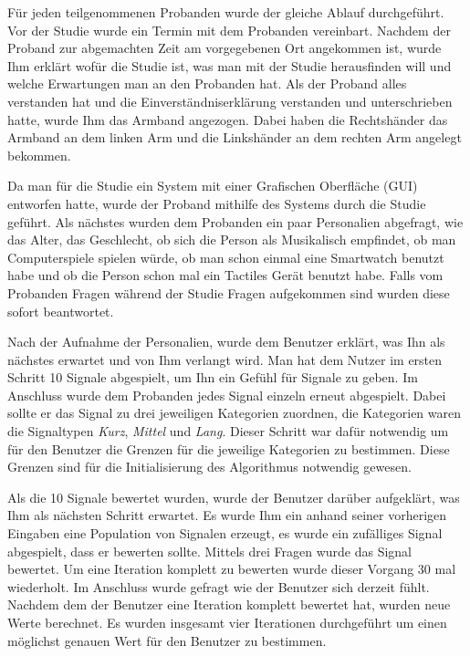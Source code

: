 F{\"u}r jeden teilgenommenen Probanden wurde der gleiche Ablauf durchgef{\"u}hrt. 
Vor der Studie wurde ein Termin mit dem Probanden vereinbart. 
Nachdem der Proband zur abgemachten Zeit am vorgegebenen Ort angekommen ist, wurde Ihm erkl{\"a}rt wof{\"u}r die Studie ist, was man mit der Studie herausfinden will und welche Erwartungen man an den Probanden hat. 
Als der Proband alles verstanden hat und die Einverst{\"a}ndniserkl{\"a}rung verstanden und unterschrieben hatte, wurde Ihm das Armband angezogen. Dabei haben die Rechtsh{\"a}nder das Armband an dem linken Arm und die Linksh{\"a}nder an dem rechten Arm angelegt bekommen.

Da man f{\"u}r die Studie ein System mit einer Grafischen Oberfl{\"a}che (GUI) entworfen hatte, wurde der Proband mithilfe des Systems durch die Studie gef{\"u}hrt.
Als nächstes wurden dem Probanden ein paar Personalien abgefragt, wie das Alter, das Geschlecht, ob sich die Person als Musikalisch empfindet, ob man Computerspiele spielen w{\"u}rde, ob man schon einmal eine Smartwatch benutzt habe und ob die Person schon mal ein Tactiles Ger{\"a}t benutzt habe. 
Falls vom Probanden Fragen w{\"a}hrend der Studie Fragen aufgekommen sind wurden diese sofort beantwortet. 

Nach der Aufnahme der Personalien, wurde dem Benutzer erkl{\"a}rt, was Ihn als n{\"a}chstes erwartet und von Ihm verlangt wird. 
Man hat dem Nutzer im ersten Schritt 10 Signale abgespielt, um Ihn ein Gef{\"u}hl f{\"u}r Signale zu geben. 
Im Anschluss wurde dem Probanden jedes Signal einzeln erneut abgespielt. 
Dabei sollte er das Signal zu drei jeweiligen Kategorien zuordnen, die Kategorien waren die Signaltypen \textit{Kurz}, \textit{Mittel} und \textit{Lang}. 
Dieser Schritt war daf{\"u}r notwendig um f{\"u}r den Benutzer die Grenzen f{\"u}r die jeweilige Kategorien zu bestimmen. 
Diese Grenzen sind f{\"u}r die Initialisierung des Algorithmus notwendig gewesen. 

Als die 10 Signale bewertet wurden, wurde der Benutzer dar{\"u}ber aufgekl{\"a}rt, was Ihm als n{\"a}chsten Schritt erwartet. 
Es wurde Ihm ein anhand seiner vorherigen Eingaben eine Population von Signalen erzeugt, es wurde ein zuf{\"a}lliges Signal abgespielt, dass er bewerten sollte.
Mittels drei Fragen wurde das Signal bewertet. 
Um eine Iteration komplett zu bewerten wurde dieser Vorgang 30 mal wiederholt. 
Im Anschluss wurde gefragt wie der Benutzer sich derzeit f{\"u}hlt. 
Nachdem dem der Benutzer eine Iteration komplett bewertet hat, wurden neue Werte berechnet.
Es wurden insgesamt vier Iterationen durchgef{\"u}hrt um einen m{\"o}glichst genauen Wert f{\"u}r den Benutzer zu bestimmen.

